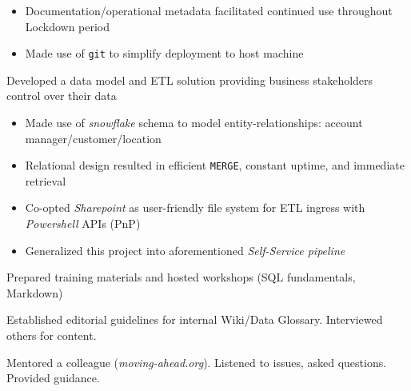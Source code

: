 \documentclass[../cv.tex]{subfiles}
\begin{document}
\begin{description}[style=multiline, leftmargin=3.5cm]
\begin{itemize}
		     \item Documentation/operational metadata facilitated continued use throughout Lockdown period
		     \item Made use of \texttt{git} to simplify deployment to host machine
	      \end{itemize}
	\item[Sales Data Model\\ \textnormal{PL/SQL\\Powershell}]
		Developed a data model and ETL solution providing business stakeholders control over their data
		  \begin{itemize}		     
			\item Made use of \textit{snowflake} schema to model entity-relationships: account manager/customer/location 
		    \item Relational design resulted in efficient \texttt{MERGE}, constant uptime, and immediate retrieval
		    \item Co-opted \textit{Sharepoint} as user-friendly file system for ETL ingress with \textit{Powershell} APIs (PnP)
		    \item Generalized this project into aforementioned \textit{Self-Service pipeline}
	      \end{itemize}
	\item[Training] Prepared training materials and hosted workshops (SQL fundamentals, Markdown)
	\item[Data Glossary] Established editorial guidelines for internal Wiki/Data Glossary. Interviewed others for content.
	\item[Mentorship] Mentored a colleague (\textit{moving-ahead.org}). Listened to issues, asked questions. Provided guidance.
\end{description}
\end{document}
